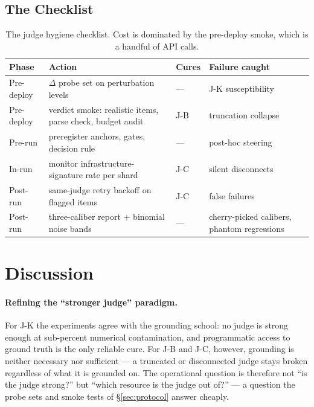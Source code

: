 \documentclass[11pt]{article}
\begin{document}
\subsection{The Checklist}
\begin{table}[h]
\centering\small
\begin{tabular}{@{}p{}p{}p{}p{}@{}}
\toprule
Phase & Action & Cures & Failure caught \\
\midrule
Pre-deploy & $\Delta$ probe set on perturbation levels & --- & J-K susceptibility \\
Pre-deploy & verdict smoke: realistic items, parse check, budget audit & J-B & truncation collapse \\
Pre-run & preregister anchors, gates, decision rule & --- & post-hoc steering \\
In-run & monitor infrastructure-signature rate per shard & J-C & silent disconnects \\
Post-run & same-judge retry backoff on flagged items & J-C & false failures \\
Post-run & three-caliber report + binomial noise bands & --- & cherry-picked calibers, phantom regressions \\
\bottomrule
\end{tabular}
\caption{The judge hygiene checklist. Cost is dominated by the pre-deploy
smoke, which is a handful of API calls.}
\label{tab:checklist}
\end{table}

\section{Discussion}
\label{sec:discussion}

\paragraph{Refining the ``stronger judge'' paradigm.}
For J-K the experiments agree with the grounding school: no judge is strong
enough at sub-percent numerical contamination, and programmatic access to
ground truth is the only reliable cure. For J-B and J-C, however, grounding
is neither necessary nor sufficient --- a truncated or disconnected judge
stays broken regardless of what it is grounded on. The operational question
is therefore not ``is the judge strong?'' but ``which resource is the judge
out of?'' --- a question the probe sets and smoke tests of \S\ref{sec:protocol}
answer cheaply.
\end{document}
